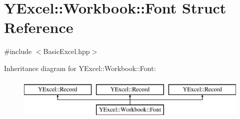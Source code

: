 \hypertarget{struct_y_excel_1_1_workbook_1_1_font}{}\section{Y\+Excel\+:\+:Workbook\+:\+:Font Struct Reference}
\label{struct_y_excel_1_1_workbook_1_1_font}


{\ttfamily \#include $<$Basic\+Excel.\+hpp$>$}

Inheritance diagram for Y\+Excel\+:\+:Workbook\+:\+:Font\+:\begin{figure}[H]
\begin{center}
\leavevmode
\includegraphics[height=2.000000cm]{struct_y_excel_1_1_workbook_1_1_font}
\end{center}
\end{figure}
